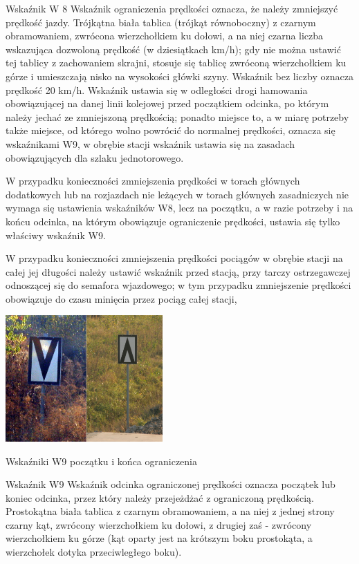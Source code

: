Wskaźnik W 8 {\textquotedbl}Wskaźnik ograniczenia prędkości{\textquotedbl} oznacza, że należy zmniejszyć prędkość jazdy. Trójkątna biała tablica (trójkąt równoboczny) z czarnym obramowaniem, zwrócona wierzchołkiem ku dołowi, a na niej czarna liczba wskazująca dozwoloną prędkość (w dziesiątkach km/h); gdy nie można ustawić tej tablicy z zachowaniem skrajni, stosuje się tablicę zwróconą wierzchołkiem ku górze i umieszczają nisko na wysokości główki szyny. Wskaźnik bez liczby oznacza prędkość 20 km/h. Wskaźnik ustawia się w odległości drogi hamowania obowiązującej na danej linii kolejowej przed początkiem odcinka, po którym należy jechać ze zmniejszoną prędkością; ponadto miejsce to, a w miarę potrzeby także miejsce, od którego wolno powrócić do normalnej prędkości, oznacza się wskaźnikami W9, w obrębie stacji wskaźnik ustawia się na zasadach obowiązujących dla szlaku jednotorowego. 

W przypadku konieczności zmniejszenia prędkości w torach głównych dodatkowych lub na rozjazdach nie leżących w torach głównych zasadniczych nie wymaga się ustawienia wskaźników W8, lecz na początku, a w razie potrzeby i na końcu odcinka, na którym obowiązuje ograniczenie prędkości, ustawia się tylko właściwy wskaźnik W9.

W przypadku konieczności zmniejszenia prędkości pociągów w obrębie stacji na całej jej długości należy ustawić wskaźnik przed stacją, przy tarczy ostrzegawczej odnoszącej się do semafora wjazdowego; w tym przypadku zmniejszenie prędkości obowiązuje do czasu minięcia przez pociąg całej stacji,
	\begin{marginfigure}
	\includegraphics[width=6cm]{skryptkierownik-img/wskazniki-w9.jpg}
	\caption{Wskaźniki W9 początku i końca ograniczenia}
\end{marginfigure}
Wskaźnik W9 {\textquotedbl}Wskaźnik odcinka ograniczonej prędkości{\textquotedbl} oznacza początek lub koniec odcinka, przez który należy przejeżdżać z ograniczoną prędkością. Prostokątna biała tablica z czarnym obramowaniem, a na niej z jednej strony czarny kąt, zwrócony wierzchołkiem ku dołowi, z drugiej zaś - zwrócony wierzchołkiem ku górze (kąt oparty jest na krótszym boku prostokąta, a wierzchołek dotyka przeciwległego boku).

